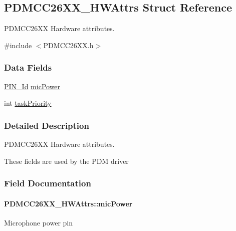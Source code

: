\subsection{P\+D\+M\+C\+C26\+X\+X\+\_\+\+H\+W\+Attrs Struct Reference}
\label{struct_p_d_m_c_c26_x_x___h_w_attrs}


P\+D\+M\+C\+C26\+X\+X Hardware attributes.  




{\ttfamily \#include $<$P\+D\+M\+C\+C26\+X\+X.\+h$>$}

\subsubsection*{Data Fields}
\begin{DoxyCompactItemize}
\item 
\hyperlink{_p_i_n_8h_a9ae8197f460bb76ea09a84f47d09921f}{P\+I\+N\+\_\+\+Id} \hyperlink{struct_p_d_m_c_c26_x_x___h_w_attrs_a719c9b1d50c606a6287deab7d20e2463}{mic\+Power}
\item 
int \hyperlink{struct_p_d_m_c_c26_x_x___h_w_attrs_a5169287c5b16c798c14fb4b5f1a77df2}{task\+Priority}
\end{DoxyCompactItemize}


\subsubsection{Detailed Description}
P\+D\+M\+C\+C26\+X\+X Hardware attributes. 

These fields are used by the P\+D\+M driver 

\subsubsection{Field Documentation}
\paragraph[{mic\+Power}]{ P\+D\+M\+C\+C26\+X\+X\+\_\+\+H\+W\+Attrs\+::mic\+Power}\label{struct_p_d_m_c_c26_x_x___h_w_attrs_a719c9b1d50c606a6287deab7d20e2463}
Microphone power pin 
